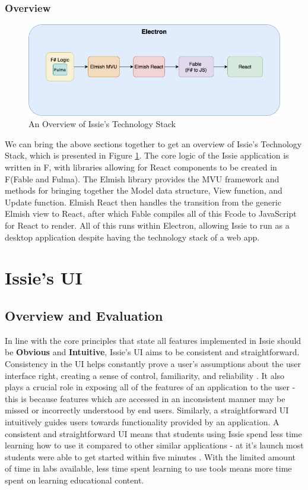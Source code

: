\subsubsection{Overview}
\begin{figure} [h]
    \centering
    \includegraphics[width=\textwidth]{02.Background/Stack.png}
    \caption{An Overview of Issie's Technology Stack}
    \label{fig:techstack}
\end{figure}
We can bring the above sections together to get an overview of Issie's Technology Stack, which is presented in Figure \ref{fig:techstack}. The core logic of the Issie application is written in F\fsharp, with libraries allowing for React components to be created in F\fsharp (Fable and Fulma). The Elmish library provides the MVU framework and methods for bringing together the Model data structure, View function, and Update function. Elmish React then handles the transition from the generic Elmish view to React, after which Fable compiles all of this F\fsharp code to JavaScript for React to render. All of this runs within Electron, allowing Issie to run as a desktop application despite having the technology stack of a web app.

\section{Issie's UI} \label{sec:IssieUI}
\subsection{Overview and Evaluation}
In line with the core principles that state all features implemented in Issie should be \textbf{Obvious} and \textbf{Intuitive}, Issie's UI aims to be consistent and straightforward. Consistency in the UI helps constantly prove a user’s assumptions about the user interface right, creating a sense of control, familiarity, and reliability \cite{uiconsistency}. It also plays a crucial role in exposing all of the features of an application to the user - this is because features which are accessed in an inconsistent manner may be missed or incorrectly understood by end users. Similarly, a straightforward UI intuitively guides users towards functionality provided by an application. A consistent and straightforward UI means that students using Issie spend less time learning how to use it compared to other similar applications - at it's launch most students were able to get started within five minutes \cite{marco_diss}. With the limited amount of time in labs available, less time spent learning to use tools means more time spent on learning educational content.

